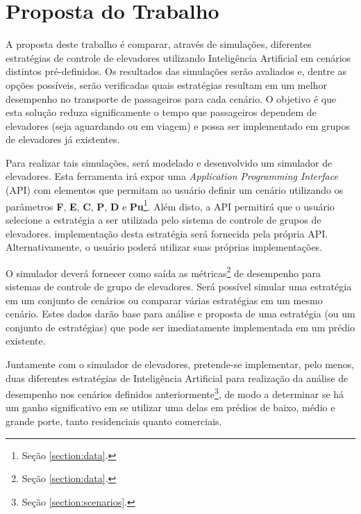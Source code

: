 \chapter{\label{chap:proposal}Proposta do Trabalho}

A proposta deste trabalho é comparar, através de simulações, diferentes
estratégias de controle de elevadores utilizando Inteligência Artificial em
cenários distintos pré-definidos. Os resultados das simulações serão avaliados
e, dentre as opções possíveis, serão verificadas quais estratégias resultam em
um melhor desempenho no transporte de passageiros para cada cenário. O objetivo
é que esta solução reduza significamente o tempo que passageiros dependem de
elevadores (seja aguardando ou em viagem) e possa ser implementado em grupos de
elevadores já existentes.

Para realizar tais simulações, será modelado e desenvolvido um simulador de
elevadores. Esta ferramenta irá expor uma \textit{Application Programming
Interface} (API) com elementos que permitam ao usuário definir um cenário
utilizando os parâmetros \textbf{F}, \textbf{E}, \textbf{C}, \textbf{P},
\textbf{D} e \textbf{Pu}\footnote{Seção \ref{section:data}.}. Além disto, a API
permitirá que o usuário selecione a estratégia a ser utilizada pelo sistema de
controle de grupos de elevadores. implementação desta estratégia será fornecida
pela própria API. Alternativamente, o usuário poderá utilizar suas próprias
implementações.

O simulador deverá fornecer como saída as métricas\footnote{Seção
\ref{section:data}.} de desempenho para sistemas de controle de grupo de
elevadores. Será possível simular uma estratégia em um conjunto de cenários ou
comparar várias estratégias em um mesmo cenário. Estes dados darão base para
análise e proposta de uma estratégia (ou um conjunto de estratégias) que pode
ser imediatamente implementada em um prédio existente.

Juntamente com o simulador de elevadores, pretende-se implementar, pelo menos,
duas diferentes estratégias de Inteligência Artificial para realização da
análise de desempenho nos cenários definidos anteriormente\footnote{Seção
\ref{section:scenarios}.}, de modo a determinar se há um ganho significativo em
se utilizar uma delas em prédios de baixo, médio e grande porte, tanto
residenciais quanto comerciais.
